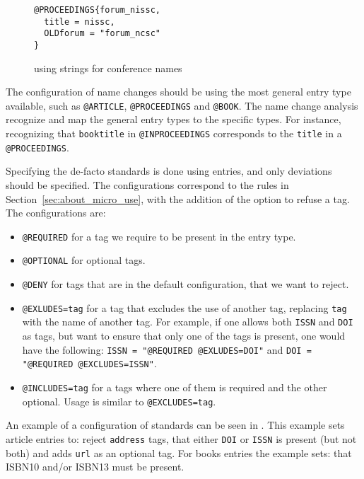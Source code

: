 \begin{figure}
  \centering
\begin{verbatim}
@PROCEEDINGS{forum_nissc,
  title = nissc,
  OLDforum = "forum_ncsc"
}
\end{verbatim}
  \caption{ using strings for conference names}
  \label{fig:analyzing_configuration_name_change_config_file_strings}
\end{figure}


The configuration of name changes should be using the most general
entry type available, such as \texttt{@ARTICLE}, \texttt{@PROCEEDINGS}
and \texttt{@BOOK}.  The name change analysis recognize and map the
general entry types to the specific types.  For instance, recognizing
that \texttt{booktitle} in \texttt{@INPROCEEDINGS} corresponds to the
\texttt{title} in a \texttt{@PROCEEDINGS}.

Specifying the de-facto standards is done using {\bibtex} entries, and
only deviations should be specified.  The configurations correspond to
the rules in Section~\ref{sec:about_micro_use}, with the addition of
the option to refuse a tag.  The configurations are:

\begin{itemize}
\item \texttt{@REQUIRED} for a tag we require to be present in the
  entry type.
\item \texttt{@OPTIONAL} for optional tags.
\item \texttt{@DENY} for tags that are in the default configuration,
  that we want to reject.
\item \texttt{@EXLUDES=tag} for a tag that excludes the use of another
  tag, replacing \texttt{tag} with the name of another tag.  For
  example, if one allows both \texttt{ISSN} and \texttt{DOI} as tags,
  but want to ensure that only one of the tags is present, one would
  have the following: \texttt{ISSN = "@REQUIRED @EXLUDES=DOI"} and
  \texttt{DOI = "@REQUIRED @EXCLUDES=ISSN"}.
\item \texttt{@INCLUDES=tag} for a tags where one of them is required
  and the other optional.  Usage is similar to \texttt{@EXCLUDES=tag}.
\end{itemize}

An example of a configuration of standards can be seen in
.  This example sets article
entries to: reject \texttt{address} tags, that either \texttt{DOI} or
\texttt{ISSN} is present (but not both) and adds \texttt{url} as an
optional tag.  For books entries the example sets: that ISBN10 and/or
ISBN13 must be present.

